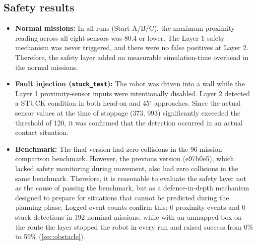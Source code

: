 \subsection{Safety results}
\begin{itemize}
    \item \textbf{Normal missions:} In all runs (Start A/B/C), the maximum proximity reading across all eight sensors was 80.4 or lower. 
    The Layer 1 safety mechanism was never triggered, and there were no false positives at Layer 2. 
    Therefore, the safety layer added no measurable simulation-time overhead in the normal missions.
    \item \textbf{Fault injection (\texttt{stuck\_test}):} The robot was driven into a wall while the Layer 1 proximity-sensor inputs were intentionally disabled. 
    Layer 2 detected a STUCK condition in both head-on and 45$^\circ$ approaches. 
    Since the actual sensor values at the time of stoppage (373, 993) significantly exceeded the threshold of 120, it was confirmed that the detection occurred in an actual contact situation.
    \item \textbf{Benchmark:} The final version had zero collisions in the 96-mission comparison benchmark. 
    However, the previous version (e97b0e5), which lacked safety monitoring during movement, also had zero collisions in the same benchmark. 
    Therefore, it is reasonable to evaluate the safety layer not as the cause of passing the benchmark, but as a defence-in-depth mechanism designed to prepare for situations that cannot be predicted during the planning phase. Logged event counts confirm this: 0 proximity events and 0 stuck detections in 192 nominal missions, while with an unmapped box on the route the layer stopped the robot in every run and raised success from 0\% to 59\% (\cref{sec:obstacle}).
\end{itemize}